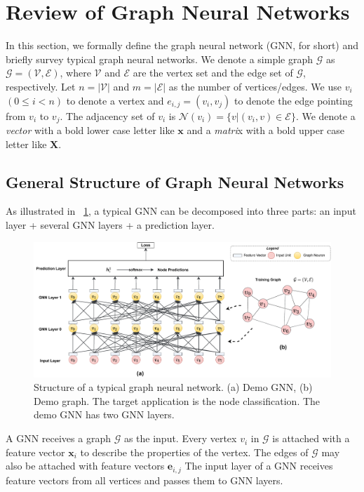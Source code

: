 \section{Review of Graph Neural Networks}
\label{sec:review_of_gnns}

In this section, we formally define the graph neural network (GNN, for short) and briefly survey typical graph neural networks.
We denote a simple graph $\mathcal{G}$ as $\mathcal{G}=(\mathcal{V}, \mathcal{E})$, where $\mathcal{V}$ and $\mathcal{E}$ are the vertex set and the edge set of $\mathcal{G}$, respectively.
Let $n=|\mathcal{V}|$ and $m=|\mathcal{E}|$ as the number of vertices/edges.
We use $v_i$ $(0 \leq i < n)$ to denote a vertex and $e_{i,j}=(v_i, v_j)$ to denote the edge pointing from $v_i$ to $v_j$.
The adjacency set of $v_i$ is $\mathcal{N}(v_i)=\{v|(v_i, v) \in \mathcal{E}\}$.
We denote a \emph{vector} with a bold lower case letter like $\boldsymbol{x}$ and a \emph{matri}x with a bold upper case letter like $\boldsymbol{X}$.

\subsection{General Structure of Graph Neural Networks}

As illustrated in \figurename~\ref{fig:general_structure_of_gnn}, a typical GNN can be decomposed into three parts: an input layer + several GNN layers + a prediction layer.

\begin{figure}
    \centering
    \includegraphics[width=1\columnwidth]{figs/illustration/GNN_common_architecture.pdf}
    \caption{Structure of a typical graph neural network. (a) Demo GNN, (b) Demo graph. The target application is the node classification. The demo GNN has two GNN layers.}
    \label{fig:general_structure_of_gnn}
\end{figure}

A GNN receives a graph $\mathcal{G}$ as the input.
Every vertex $v_i$ in $\mathcal{G}$ is attached with a feature vector $\boldsymbol{x}_i$ to describe the properties of the vertex.
The edges of $\mathcal{G}$ may also be attached with feature vectors $\boldsymbol{e}_{i,j}$
The input layer of a GNN receives feature vectors from all vertices and passes them to GNN layers.

